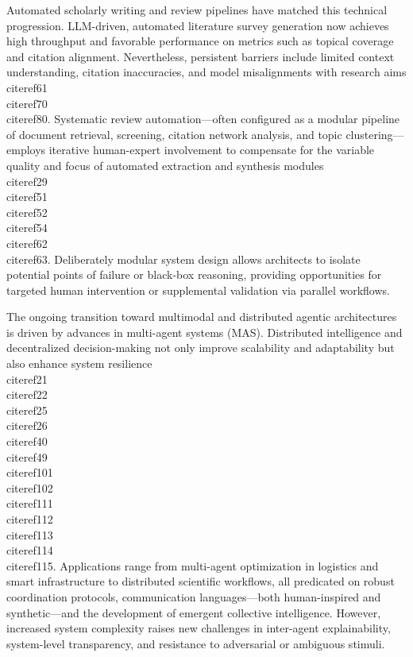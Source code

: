 \documentclass[11pt]{article}
\begin{document}
Automated scholarly writing and review pipelines have matched this technical progression. LLM-driven, automated literature survey generation now achieves high throughput and favorable performance on metrics such as topical coverage and citation alignment. Nevertheless, persistent barriers include limited context understanding, citation inaccuracies, and model misalignments with research aims \\cite{ref61}\\cite{ref70}\\cite{ref80}. Systematic review automation—often configured as a modular pipeline of document retrieval, screening, citation network analysis, and topic clustering—employs iterative human-expert involvement to compensate for the variable quality and focus of automated extraction and synthesis modules \\cite{ref29}\\cite{ref51}\\cite{ref52}\\cite{ref54}\\cite{ref62}\\cite{ref63}. Deliberately modular system design allows architects to isolate potential points of failure or black-box reasoning, providing opportunities for targeted human intervention or supplemental validation via parallel workflows.

The ongoing transition toward multimodal and distributed agentic architectures is driven by advances in multi-agent systems (MAS). Distributed intelligence and decentralized decision-making not only improve scalability and adaptability but also enhance system resilience \\cite{ref21}\\cite{ref22}\\cite{ref25}\\cite{ref26}\\cite{ref40}\\cite{ref49}\\cite{ref101}\\cite{ref102}\\cite{ref111}\\cite{ref112}\\cite{ref113}\\cite{ref114}\\cite{ref115}. Applications range from multi-agent optimization in logistics and smart infrastructure to distributed scientific workflows, all predicated on robust coordination protocols, communication languages—both human-inspired and synthetic—and the development of emergent collective intelligence. However, increased system complexity raises new challenges in inter-agent explainability, system-level transparency, and resistance to adversarial or ambiguous stimuli.
\end{document}
